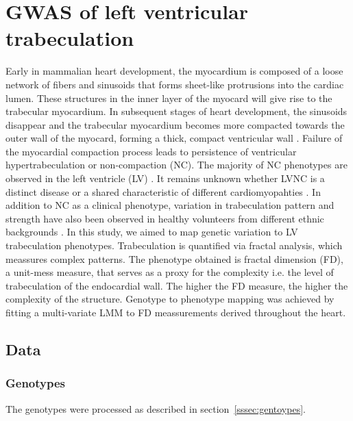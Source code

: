 \section{GWAS of left ventricular trabeculation}
\label{section:GWAS_FD}
Early in mammalian heart development, the myocardium is composed of a loose network of fibers and sinusoids that forms sheet-like protrusions into the cardiac lumen. These structures in the inner layer of the myocard will give rise to the trabecular myocardium. In subsequent stages of heart development, the sinusoids disappear and the trabecular myocardium becomes more compacted towards the outer wall of the myocard, forming a thick, compact ventricular wall \citep{Chen2009,Yousef2009}. Failure of the myocardial compaction process leads to persistence of ventricular hypertrabeculation or non-compaction (NC). The majority of NC phenotypes are observed in the left ventricle (LV) \citep{Zambrano2002}. It remains unknown whether LVNC is a distinct disease or a shared characteristic of different cardiomyopahties \citep{Captur2013}. In addition to NC as a clinical phenotype, variation in trabeculation pattern and strength have also been observed in healthy volunteers from different ethnic backgrounds \citep{Kawel2012,Captur2015}. In this study, we aimed to map genetic variation to LV trabeculation phenotypes. Trabeculation is quantified via fractal analysis, which meassures complex patterns. The phenotype obtained is fractal dimension (FD), a unit-mess measure, that serves as a proxy for the complexity i.e. the level of trabeculation of the endocardial wall. The higher the FD measure, the higher the complexity  of the structure. Genotype to phenotype mapping was achieved by fitting a multi-variate LMM to FD meassurements derived throughout the heart.

\subsection{Data}
\subsubsection{Genotypes}

The genotypes were processed as described in section~\ref{sssec:gentoypes}. 


